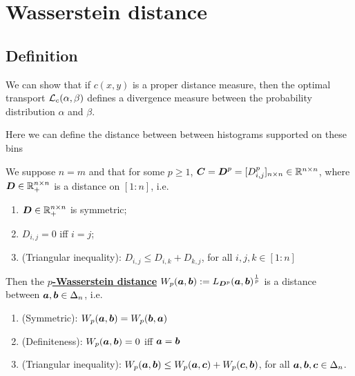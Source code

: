 \documentclass[11pt]{article}
\begin{document}
\newpage
\section{Wasserstein distance}
\subsection{Definition}
We can show that if $c(x,y)$ is a proper distance measure, then the optimal transport ${\mathcal L}_{c}(\alpha, \beta)$ defines a divergence measure between the probability distribution $\alpha$ and $\beta$.

Here we can define the distance between between histograms supported on these bins
\begin{proposition}
We suppose $n = m$ and that for some $p \ge 1$, $\boldsymbol{C} = \boldsymbol{D}^p = [D_{i,j}^p]_{n\times n} \in {\mathbb R}^{n \times n}$, where $
\boldsymbol{D} \in {\mathbb R}_{+}^{n\times n}$ is a distance on $[1:n]$, i.e. 
\begin{enumerate}
\item $\boldsymbol{D} \in {\mathbb R}_{+}^{n\times n}$ is symmetric; 
\item $D_{i,j} = 0$ iff  $i=j$;
\item (Triangular inequality): \; $D_{i,j} \le D_{i,k} + D_{k,j}$, for all $i,j,k \in [1:n]$
\end{enumerate}
Then the \underline{\textbf{$p$-Wasserstein distance}} $W_{p}(\boldsymbol{a}, \boldsymbol{b}) := L_{\boldsymbol{D}^{p}}(\boldsymbol{a}, \boldsymbol{b})^{\frac{1}{p}}$ is a distance between $\boldsymbol{a}, \boldsymbol{b} \in \Delta_{n}$, i.e. 
\begin{enumerate}
\item (Symmetric):\; $W_{p}(\boldsymbol{a}, \boldsymbol{b}) = W_{p}(\boldsymbol{b}, \boldsymbol{a})$
\item (Definiteness):\; $W_{p}(\boldsymbol{a}, \boldsymbol{b}) = 0 $ iff $\boldsymbol{a} = \boldsymbol{b}$
\item (Triangular inequality): \; $W_{p}(\boldsymbol{a}, \boldsymbol{b})  \le W_{p}(\boldsymbol{a}, \boldsymbol{c})  + W_{p}(\boldsymbol{c}, \boldsymbol{b}) $, for all $\boldsymbol{a}, \boldsymbol{b}, \boldsymbol{c} \in \Delta_{n}$.
\end{enumerate}
\end{proposition}
\end{document}
